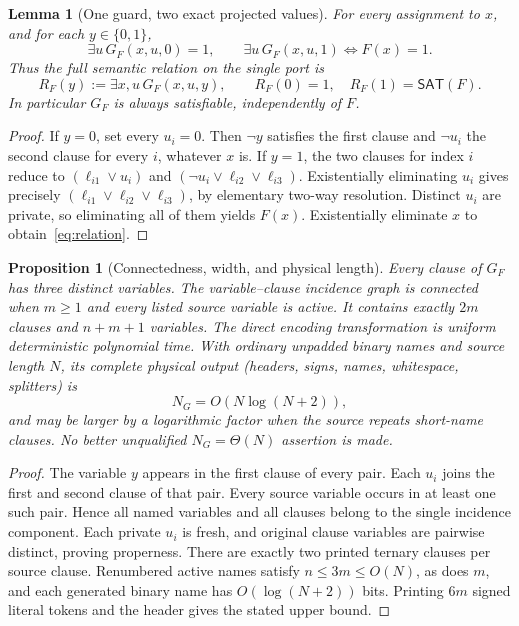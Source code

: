 \documentclass[11pt]{article}
\newtheorem{lemma}[theorem]{Lemma}
\newtheorem{proposition}[theorem]{Proposition}
\begin{document}
\begin{lemma}[One guard, two exact projected values]\label{lem:guard}
For every assignment to $x$, and for each $y\in\{0,1\}$,
\[
 \exists u\,G_F(x,u,0)=1,\qquad
 \exists u\,G_F(x,u,1)\iff F(x)=1.
\]
Thus the full semantic relation on the single port is
\begin{equation}\label{eq:relation}
 R_F(y):=\exists x,u\,G_F(x,u,y),\qquad
 \boxed{R_F(0)=1,\quad R_F(1)=\mathsf{SAT}(F).}
\end{equation}
In particular $G_F$ is \emph{always satisfiable}, independently of $F$.
\end{lemma}
\begin{proof}
If $y=0$, set every $u_i=0$. Then $\neg y$ satisfies the first clause and $\neg u_i$ the second clause for every $i$, whatever $x$ is. If $y=1$, the two clauses for index $i$ reduce to $(\ell_{i1}\vee u_i)$ and $(\neg u_i\vee\ell_{i2}\vee\ell_{i3})$. Existentially eliminating $u_i$ gives precisely $(\ell_{i1}\vee\ell_{i2}\vee\ell_{i3})$, by elementary two-way resolution. Distinct $u_i$ are private, so eliminating all of them yields $F(x)$. Existentially eliminate $x$ to obtain~\eqref{eq:relation}.
\end{proof}

\begin{proposition}[Connectedness, width, and physical length]\label{prop:physical}
Every clause of $G_F$ has three distinct variables. The variable--clause incidence graph is connected when $m\ge1$ and every listed source variable is active. It contains exactly $2m$ clauses and $n+m+1$ variables. The direct encoding transformation is uniform deterministic polynomial time. With ordinary unpadded binary names and source length $N$, its complete physical output (headers, signs, names, whitespace, splitters) is
\[
 \boxed{N_G=O(N\log(N+2))},
\]
and may be larger by a logarithmic factor when the source repeats short-name clauses. No better unqualified $N_G=\Theta(N)$ assertion is made.
\end{proposition}
\begin{proof}
The variable $y$ appears in the first clause of every pair. Each $u_i$ joins the first and second clause of that pair. Every source variable occurs in at least one such pair. Hence all named variables and all clauses belong to the single incidence component. Each private $u_i$ is fresh, and original clause variables are pairwise distinct, proving properness. There are exactly two printed ternary clauses per source clause. Renumbered active names satisfy $n\le3m\le O(N)$, as does $m$, and each generated binary name has $O(\log(N+2))$ bits. Printing $6m$ signed literal tokens and the header gives the stated upper bound.
\end{proof}
\end{document}
